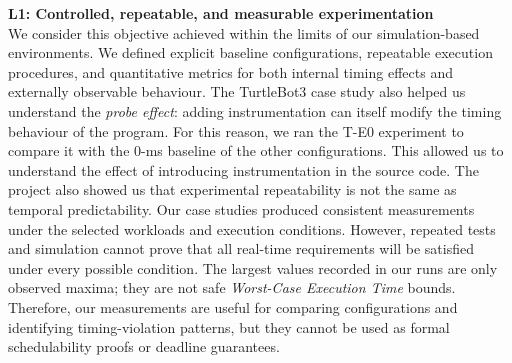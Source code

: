\noindent\textbf{L1: Controlled, repeatable, and measurable experimentation} \\ %
We consider this objective achieved within the limits of our simulation-based environments. We defined explicit baseline configurations, repeatable execution procedures, and quantitative metrics for both internal timing effects and externally observable behaviour.
The TurtleBot3 case study also helped us understand the \textit{probe effect}: adding instrumentation can itself modify the timing behaviour of the program. For this reason, we ran the T-E0 experiment to compare it with the 0-ms baseline of the other configurations. This allowed us to understand the effect of introducing instrumentation in the source code.
The project also showed us that experimental repeatability is not the same as temporal predictability. Our case studies produced consistent measurements under the selected workloads and execution conditions. However, repeated tests and simulation cannot prove that all real-time requirements will be satisfied under every possible condition. The largest values recorded in our runs are only observed maxima; they are
not safe \textit{Worst-Case Execution Time} bounds. Therefore, our measurements are useful for comparing configurations and identifying timing-violation patterns, but they cannot be used as formal schedulability proofs or deadline guarantees.

